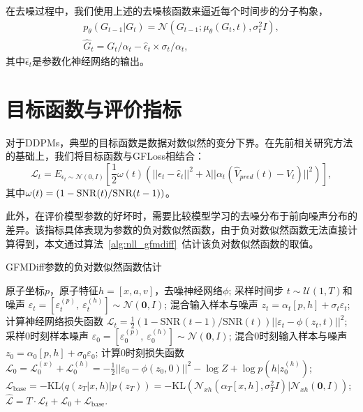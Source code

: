 在去噪过程中，我们使用上述的去噪核函数来逼近每个时间步的分子构象，
\begin{eqnarray}
    &p_\theta(G_{t-1}|G_t) = \mathcal{N}(G_{t-1}; \mu_\theta(G_t,t),\sigma_t^2 I),& \\
    &\hat{G}_t = G_t / \alpha_t - \hat{\epsilon}_t \times \sigma_t / \alpha_t ,&
\end{eqnarray}
其中$\hat{\epsilon}_t$是参数化神经网络的输出。

\section{目标函数与评价指标}

对于DDPMs，典型的目标函数是数据对数似然的变分下界。在先前相关研究方法的基础上，我们将目标函数与GFLoss相结合：
\begin{equation}
    \mathcal{L}_t = E_{\epsilon_t \sim \mathcal{N}(0, I)} \left[ \frac{1}{2} \omega(t) \left( ||\epsilon_t - \hat{\epsilon}_t||^2 + \lambda || \alpha_t(\hat{V}_{pred}(t) - V_t)||^2 \right) \right],
\end{equation}
其中$\omega(t) = (1-{\rm SNR}(t)/{\rm SNR}(t-1))$。

此外，在评价模型参数的好坏时，需要比较模型学习的去噪分布于前向噪声分布的差异。该指标具体表现为参数的负对数似然函数，由于负对数似然函数无法直接计算得到，本文通过算法~\ref{alg:nll_gfmdiff}~估计该负对数似然函数的取值。

\begin{algorithm}[H]
    \caption{GFMDiff参数的负对数似然函数估计}
    \label{alg:nll_gfmdiff}
    \begin{algorithmic}
     原子坐标$p$，原子特征$h = [x, a, v]$，去噪神经网络$\phi$;
    \STATE 采样时间步 $t \sim \mathcal{U}(1, T)$和噪声 $\varepsilon_t = [\varepsilon^{(p)}_t, ~\varepsilon^{(h)}_t] \sim \mathcal{N}(\mathbf{0}, I)$;
    \STATE 混合输入样本与噪声 $z_t = \alpha_t [p, h] + \sigma_t \varepsilon_t$;
    \STATE 计算神经网络损失函数 $\mathcal{L}_t = \frac{1}{2}(1 - \mathrm{SNR}(t-1) / \mathrm{SNR}(t)) ||\varepsilon_t - \phi(z_t, t)||^2$;
    \STATE 采样0时刻样本噪声 $\varepsilon_0 = [\varepsilon^{(p)}_0, ~\varepsilon^{(h)}_0] \sim \mathcal{N}(\mathbf{0}, I)$;
    \STATE 混合0时刻输入样本与噪声 $z_0 = \alpha_0 [p, h] + \sigma_0 \varepsilon_0$;
    \STATE 计算0时刻损失函数 $\mathcal{L}_0 = \mathcal{L}_0^{(x)} + \mathcal{L}_0^{(h)} = -\frac{1}{2} ||\varepsilon_0 - \phi(z_0, 0)||^2 - \log Z + \log p(h | z_0^{(h)})$;
    \STATE $\mathcal{L}_{\text{base}} = -\mathrm{KL}(q(z_T | x, h) | p(z_T)) = -\mathrm{KL}(\mathcal{N}_{xh}(\alpha_T [x, h], \sigma_T^2 I) | \mathcal{N}_{xh}(\mathbf{0}, I))$;
     $\hat{\mathcal{L}} = T \cdot \mathcal{L}_t + \mathcal{L}_0 + \mathcal{L}_{\text{base}}$.
    \end{algorithmic}
\end{algorithm}

